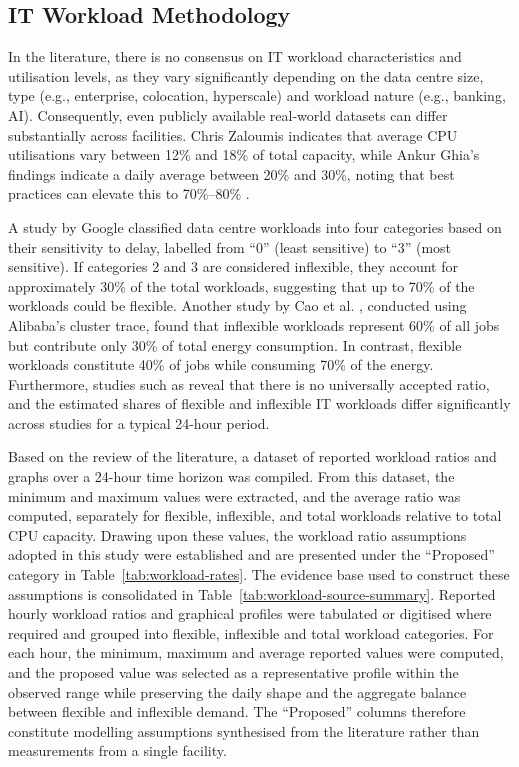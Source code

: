 \documentclass[lettersize,journal]{IEEEtran}
\newcommand{\rev}[1]{\textcolor{blue!70!black}{#1}}
\begin{document}
\label{sec: methodology}
\subsection{IT Workload Methodology}
 
In the literature, there is no consensus on IT workload characteristics and utilisation levels, as they vary significantly depending on the data centre size, type (e.g., enterprise, colocation, hyperscale) and workload nature (e.g., banking, AI). Consequently, even publicly available real-world datasets can differ substantially across facilities. Chris Zaloumis \cite{Zaloumis2022IBM} indicates that average CPU utilisations vary between 12\% and 18\% of total capacity, while Ankur Ghia's findings indicate a daily average between 20\% and 30\%, noting that best practices can elevate this to 70\%--80\% \cite{Ghia2011McKinsey}. 
 
 A study by Google \cite{6779441} classified data centre workloads into four categories based on their sensitivity to delay, labelled from ``0'' (least sensitive) to ``3'' (most sensitive). If categories 2 and 3 are considered inflexible, they account for approximately 30\% of the total workloads, suggesting that up to 70\% of the workloads could be flexible. Another study by Cao et al. \cite{Cao2022ApEn}, conducted using Alibaba’s cluster trace, found that inflexible workloads represent 60\% of all jobs but contribute only 30\% of total energy consumption. In contrast, flexible workloads constitute 40\% of jobs while consuming 70\% of the energy. Furthermore, studies such as \cite{Misaghian2023TIA,Xu2023SPIE,Zhou2024IJEPES,Fu2020ApEn,Liu2012PER} reveal that there is no universally accepted ratio, and the estimated shares of flexible and inflexible IT workloads differ significantly across studies for a typical 24-hour period. 

Based on the review of the literature, a dataset of reported workload ratios and graphs over a 24-hour time horizon was compiled. From this dataset, the minimum and maximum values were extracted, and the average ratio was computed, separately for flexible, inflexible, and total workloads relative to total CPU capacity. Drawing upon these values, the workload ratio assumptions adopted in this study were established and are presented under the ``Proposed'' category in Table~\ref{tab:workload-rates}. \rev{The evidence base used to construct these assumptions is consolidated in Table~\ref{tab:workload-source-summary}. Reported hourly workload ratios and graphical profiles were tabulated or digitised where required and grouped into flexible, inflexible and total workload categories. For each hour, the minimum, maximum and average reported values were computed, and the proposed value was selected as a representative profile within the observed range while preserving the daily shape and the aggregate balance between flexible and inflexible demand. The ``Proposed'' columns therefore constitute modelling assumptions synthesised from the literature rather than measurements from a single facility.}
\end{document}
